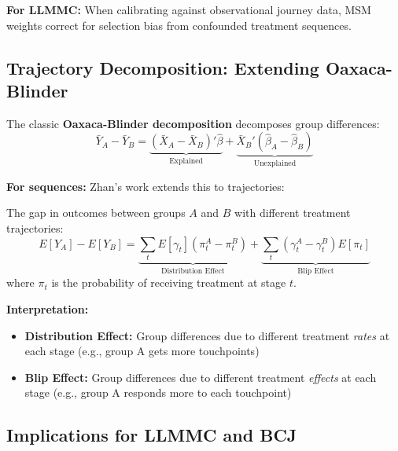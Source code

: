 \textbf{For LLMMC:} When calibrating against observational journey data, MSM weights
correct for selection bias from confounded treatment sequences.

\subsection{Trajectory Decomposition: Extending Oaxaca-Blinder}

The classic \textbf{Oaxaca-Blinder decomposition} \citep{oaxaca1973decomposition}
decomposes group differences:
\[
\bar{Y}_A - \bar{Y}_B = \underbrace{(\bar{X}_A - \bar{X}_B)'\hat{\beta}}_{\text{Explained}} + \underbrace{\bar{X}_B'(\hat{\beta}_A - \hat{\beta}_B)}_{\text{Unexplained}}
\]

\textbf{For sequences:} Zhan's work extends this to trajectories:

\begin{tcolorbox}[colback=green!5!white, colframe=green!75!black,
    title=Trajectory Gap Decomposition]
The gap in outcomes between groups $A$ and $B$ with different treatment trajectories:
\[
E[Y_A] - E[Y_B] = \underbrace{\sum_t E[\gamma_t](\pi_t^A - \pi_t^B)}_{\text{Distribution Effect}} + \underbrace{\sum_t (\gamma_t^A - \gamma_t^B)E[\pi_t]}_{\text{Blip Effect}}
\]
where $\pi_t$ is the probability of receiving treatment at stage $t$.

\textbf{Interpretation:}
\begin{itemize}[nosep]
\item \textbf{Distribution Effect:} Group differences due to different treatment \emph{rates}
at each stage (e.g., group A gets more touchpoints)
\item \textbf{Blip Effect:} Group differences due to different treatment \emph{effects}
at each stage (e.g., group A responds more to each touchpoint)
\end{itemize}
\end{tcolorbox}

\subsection{Implications for LLMMC and BCJ}

